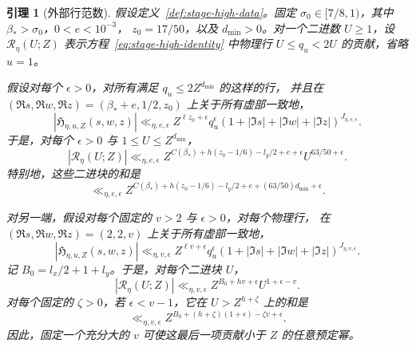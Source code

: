 \documentclass[11pt,a4paper]{article}
\numberwithin{equation}{section}
\numberwithin{figure}{section}
\newtheorem{lemma}[theorem]{引理}
\theoremstyle{definition}
\theoremstyle{remark}
\begin{document}
\begin{lemma}[外部行范数]
\label{lem:outer-row-tails}
假设定义~\ref{def:stage-high-data}。固定
$\sigma_0\in[7/8,1)$，其中 $\beta_*>\sigma_0$，$0<e<10^{-3}$，
$z_0=17/50$，以及 $d_{\min}>0$。对一个二进数 $U\ge1$，设
$\mathscr R_\eta(U;Z)$ 表示方程~\eqref{eq:stage-high-identity} 中物理行
$U\le q_u<2U$ 的贡献，省略 $u=1$。

假设对每个 $\epsilon>0$，对所有满足 $q_u\le2Z^{d_{\min}}$ 的这样的行，
并且在 $(\Re s,\Re w,\Re z)=(\beta_*+e,1/2,z_0)$ 上关于所有虚部一致地，
\begin{equation}
 |\mathfrak H_{\eta,u,Z}(s,w,z)|
 \ll_{\eta,e,\epsilon}
 Z^{\ell z_0+\epsilon}q_u^\epsilon
 (1+|\Im s|+|\Im w|+|\Im z|)^{J_{\eta,e,\epsilon}}.
 \label{eq:small-correction-bound}
\end{equation}
于是，对每个 $\epsilon>0$ 与 $1\le U\le Z^{d_{\min}}$，
\begin{equation}
 |\mathscr R_\eta(U;Z)|
 \ll_{\eta,e,\epsilon}
 Z^{C(\beta_*)+h(z_0-1/6)-l_y/2+e+\epsilon}
       U^{63/50+\epsilon}.
 \label{eq:small-row-bound}
\end{equation}
特别地，这些二进块的和是
\begin{equation}
 \ll_{\eta,e,\epsilon}
 Z^{C(\beta_*)+h(z_0-1/6)-l_y/2+e+(63/50)d_{\min}+\epsilon}.
 \label{eq:small-row-sum}
\end{equation}

对另一端，假设对每个固定的 $v>2$ 与 $\epsilon>0$，对每个物理行，
在 $(\Re s,\Re w,\Re z)=(2,2,v)$ 上关于所有虚部一致地，
\begin{equation}
 |\mathfrak H_{\eta,u,Z}(s,w,z)|
 \ll_{\eta,v,\epsilon}
 Z^{\ell v+\epsilon}q_u^\epsilon
 (1+|\Im s|+|\Im w|+|\Im z|)^{J_{\eta,v,\epsilon}}.
 \label{eq:large-correction-bound}
\end{equation}
记 $B_0=l_x/2+1+l_y$。于是，对每个二进块 $U$，
\begin{equation}
 |\mathscr R_\eta(U;Z)|
 \ll_{\eta,v,\epsilon}Z^{B_0+hv+\epsilon}U^{1+\epsilon-v}.
 \label{eq:large-row-bound}
\end{equation}
对每个固定的 $\zeta>0$，若 $\epsilon<v-1$，它在 $U>Z^{h+\zeta}$ 上的和是
\begin{equation}
 \ll_{\eta,v,\epsilon}
 Z^{B_0+(h+\zeta)(1+\epsilon)-\zeta v+\epsilon}.
 \label{eq:large-row-sum}
\end{equation}
因此，固定一个充分大的 $v$ 可使这最后一项贡献小于 $Z$ 的任意预定幂。
\end{lemma}
\end{document}
